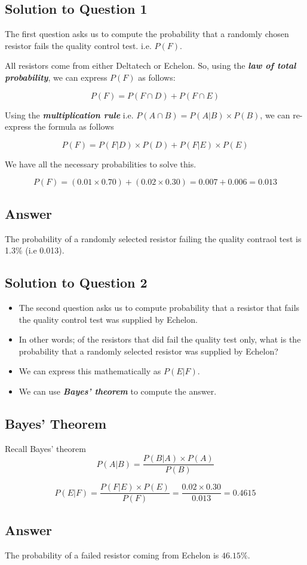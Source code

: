 \documentclass[a4paper,12pt]{article}
\begin{document}
\subsection*{Solution to Question 1}
\noindent The first question asks us to compute the probability that a randomly chosen resistor fails the quality control test. i.e. $P(F)$.\\
\bigskip


\noindent All resistors come from either Deltatech or Echelon. So, using the \textbf{\emph{law of total probability}}, we can express $P(F)$ as follows:

\[ P(F)  = P(F \cap D) + P(F \cap E) \]
\medskip


\noindent Using the \textbf{\emph{multiplication rule}}  i.e. $P(A \cap B) = P(A|B) \times P(B)$, we can re-express the formula as follows

\[ P(F)  = P(F|D) \times P(D) + P(F|E) \times P(E) \]

We have all the necessary probabilities to solve this.

\[ P(F)  = \left(0.01 \times 0.70\right) + \left(0.02 \times 0.30\right)   = 0.007 + 0.006  = 0.013\]

\subsection*{Answer}The probability of a randomly selected resistor failing the quality contraol test is 1.3\% (i.e 0.013).

\subsection*{Solution to Question 2}


	
	\begin{itemize}
		\item
		The second question asks us to compute probability that a resistor that fails the quality control test was supplied by Echelon.
		\item In other words; of the resistors that did fail the quality test only, what is the probability that a randomly selected resistor was supplied by Echelon?
		\item We can express this mathematically as $P(E|F)$.
		\item We can use \textbf{\emph{Bayes' theorem}} to compute the answer.
	\end{itemize}
	
	
	\subsection*{Bayes' Theorem}
	Recall Bayes' theorem
	\[ P(A|B) = \frac{P(B|A)\times P(A)}{P(B)} \]
	\bigskip
	
	\[ P(E|F) = \frac{P(F|E)\times P(E)}{P(F)}  =  \frac{0.02 \times 0.30}{0.013} = 0.4615\]
	
\subsection*{Answer}The probability of a failed resistor coming from Echelon is $46.15\%$.
	
\end{document}
